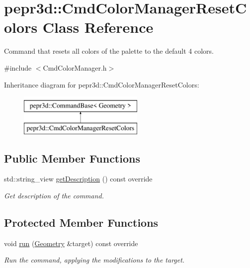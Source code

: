 \hypertarget{classpepr3d_1_1_cmd_color_manager_reset_colors}{}\section{pepr3d\+::Cmd\+Color\+Manager\+Reset\+Colors Class Reference}
\label{classpepr3d_1_1_cmd_color_manager_reset_colors}


Command that resets all colors of the palette to the default 4 colors.  




{\ttfamily \#include $<$Cmd\+Color\+Manager.\+h$>$}

Inheritance diagram for pepr3d\+::Cmd\+Color\+Manager\+Reset\+Colors\+:\begin{figure}[H]
\begin{center}
\leavevmode
\includegraphics[height=2.000000cm]{classpepr3d_1_1_cmd_color_manager_reset_colors}
\end{center}
\end{figure}
\subsection*{Public Member Functions}
\begin{DoxyCompactItemize}
\item 
\mbox{\label{classpepr3d_1_1_cmd_color_manager_reset_colors_a79a788c0d947780c54e94ceb0eeafcfb}} 
std\+::string\+\_\+view \mbox{\hyperlink{classpepr3d_1_1_cmd_color_manager_reset_colors_a79a788c0d947780c54e94ceb0eeafcfb}{get\+Description}} () const override
\begin{DoxyCompactList}\small\item\em Get description of the command. \end{DoxyCompactList}\end{DoxyCompactItemize}
\subsection*{Protected Member Functions}
\begin{DoxyCompactItemize}
\item 
\mbox{\label{classpepr3d_1_1_cmd_color_manager_reset_colors_a95da87e8ba7e901470c93b51f199f05a}} 
void \mbox{\hyperlink{classpepr3d_1_1_cmd_color_manager_reset_colors_a95da87e8ba7e901470c93b51f199f05a}{run}} (\mbox{\hyperlink{classpepr3d_1_1_geometry}{Geometry}} \&target) const override
\begin{DoxyCompactList}\small\item\em Run the command, applying the modifications to the target. \end{DoxyCompactList}\end{DoxyCompactItemize}



